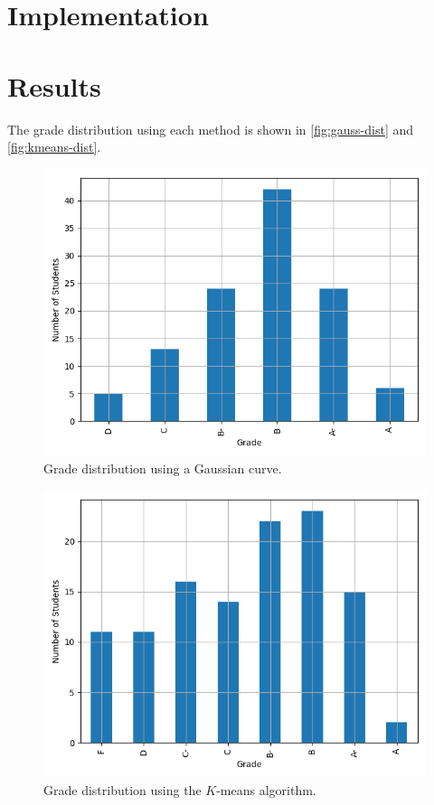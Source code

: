 \documentclass[conference]{IEEEtran}
\begin{document}
\section{Implementation}
\label{sec:implementation}

\section{Results}
\label{sec:results}
The grade distribution using each method is shown in \autoref {fig:gauss-dist}
and \autoref{fig:kmeans-dist}.
\begin{figure}[!ht]
    \centering
    \includegraphics[width=\columnwidth]{figs/grades_gauss.png}
    \caption{Grade distribution using a Gaussian curve.}
    \label{fig:gauss-dist}
\end{figure}
\begin{figure}[!ht]
    \centering
    \includegraphics[width=\columnwidth]{figs/grades_kmeans.png}
    \caption{Grade distribution using the $K$-means algorithm.}
    \label{fig:kmeans-dist}
\end{figure}
\end{document}
